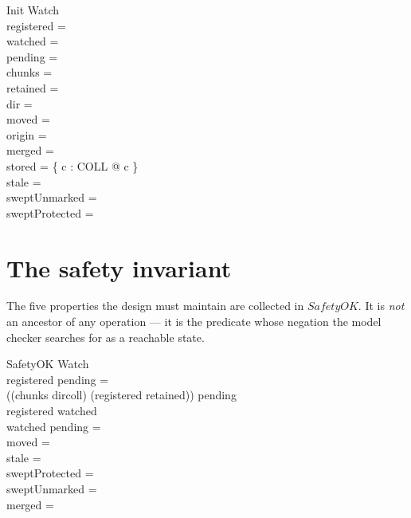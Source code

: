 \documentclass[a4paper]{article}
\begin{document}
\begin{schema}{Init}
  Watch \\
  \where
  registered = \emptyset \\
  watched = \emptyset \\
  pending = \emptyset \\
  chunks = \emptyset \\
  retained = \emptyset \\
  dir = \emptyset \\
  moved = \emptyset \\
  origin = \emptyset \\
  merged = \emptyset \\
  stored = \{ c : COLL @ c \mapsto \emptyset \} \\
  stale = \emptyset \\
  sweptUnmarked = \emptyset \\
  sweptProtected = \emptyset
\end{schema}

\section{The safety invariant}

The five properties the design must maintain are collected in $SafetyOK$.  It is
\textit{not} an ancestor of any operation --- it is the predicate whose negation
the model checker searches for as a reachable state.

\begin{schema}{SafetyOK}
  Watch \\
  \where
  registered \cap pending = \emptyset \\
  ((chunks \cap dircoll) \setminus (registered \cup retained)) \subseteq pending \\
  registered \subseteq watched \\
  watched \cap pending = \emptyset \\
  moved = \emptyset \\
  stale = \emptyset \\
  sweptProtected = \emptyset \\
  sweptUnmarked = \emptyset \\
  merged = \emptyset
\end{schema}
\end{document}
